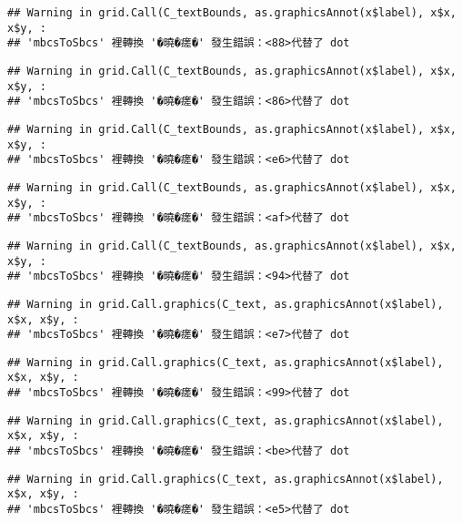 \documentclass[
]{article}
\begin{document}
\begin{verbatim}
## Warning in grid.Call(C_textBounds, as.graphicsAnnot(x$label), x$x, x$y, :
## 'mbcsToSbcs' 裡轉換 '�曉�瘥�' 發生錯誤：<88>代替了 dot
\end{verbatim}

\begin{verbatim}
## Warning in grid.Call(C_textBounds, as.graphicsAnnot(x$label), x$x, x$y, :
## 'mbcsToSbcs' 裡轉換 '�曉�瘥�' 發生錯誤：<86>代替了 dot
\end{verbatim}

\begin{verbatim}
## Warning in grid.Call(C_textBounds, as.graphicsAnnot(x$label), x$x, x$y, :
## 'mbcsToSbcs' 裡轉換 '�曉�瘥�' 發生錯誤：<e6>代替了 dot
\end{verbatim}

\begin{verbatim}
## Warning in grid.Call(C_textBounds, as.graphicsAnnot(x$label), x$x, x$y, :
## 'mbcsToSbcs' 裡轉換 '�曉�瘥�' 發生錯誤：<af>代替了 dot
\end{verbatim}

\begin{verbatim}
## Warning in grid.Call(C_textBounds, as.graphicsAnnot(x$label), x$x, x$y, :
## 'mbcsToSbcs' 裡轉換 '�曉�瘥�' 發生錯誤：<94>代替了 dot
\end{verbatim}

\begin{verbatim}
## Warning in grid.Call.graphics(C_text, as.graphicsAnnot(x$label), x$x, x$y, :
## 'mbcsToSbcs' 裡轉換 '�曉�瘥�' 發生錯誤：<e7>代替了 dot
\end{verbatim}

\begin{verbatim}
## Warning in grid.Call.graphics(C_text, as.graphicsAnnot(x$label), x$x, x$y, :
## 'mbcsToSbcs' 裡轉換 '�曉�瘥�' 發生錯誤：<99>代替了 dot
\end{verbatim}

\begin{verbatim}
## Warning in grid.Call.graphics(C_text, as.graphicsAnnot(x$label), x$x, x$y, :
## 'mbcsToSbcs' 裡轉換 '�曉�瘥�' 發生錯誤：<be>代替了 dot
\end{verbatim}

\begin{verbatim}
## Warning in grid.Call.graphics(C_text, as.graphicsAnnot(x$label), x$x, x$y, :
## 'mbcsToSbcs' 裡轉換 '�曉�瘥�' 發生錯誤：<e5>代替了 dot
\end{verbatim}
\end{document}
